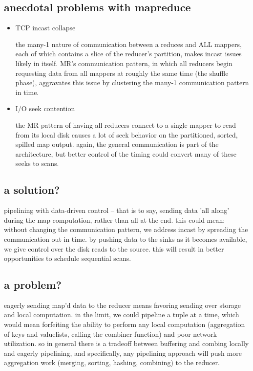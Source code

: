 \subsection{anecdotal problems with mapreduce}
\begin{itemize}

\item{TCP incast collapse}  

the many-1 nature of communication between a reduces and ALL mappers,
each of which contains a slice of the reducer's partition, makes
incast issues likely in itself.  MR's communication pattern, in which
all reducers begin requesting data from all mappers at roughly the
same time (the shuffle phase), aggravates this issue by clustering the
many-1 communication pattern in time. 

\item{I/O seek contention}  

the MR pattern of having all reducers connect to a single mapper to read from its local disk causes a lot of seek behavior on the partitioned, sorted, spilled map output.  again, the general communication is part of the architecture, but better control of the timing could convert many of these seeks to scans.

\end{itemize}

\subsection{a solution?}

pipelining with data-driven control -- that is to say, sending data 'all along' during the map computation, rather than all at the end.  this could mean:
without changing the communication pattern, we address incast by spreading the communication out in time.
by pushing data to the sinks as it becomes available, we give control
over the disk reads to the source.  this will result in better opportunities to schedule sequential scans.

\subsection{a problem?}

eagerly sending map'd data to the reducer means favoring sending over storage and local computation.  in the limit, we could pipeline a tuple at a time, which would mean forfeiting the ability to perform any local computation (aggregation of keys and valuelists, calling the combiner function) and poor network utilization.  so in general there is a tradeoff between buffering and combing locally and eagerly pipelining, and specifically, any pipelining approach will push more aggregation work (merging, sorting, hashing, combining) to the reducer.

